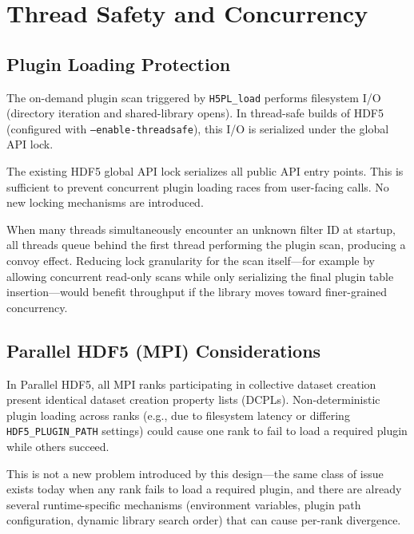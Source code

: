 \documentclass[../RFC-HDFG-2026-001.tex]{subfiles}
\begin{document}
\section{Thread Safety and Concurrency}
\label{sec:thread-safety}

\subsection{Plugin Loading Protection}

The on-demand plugin scan triggered by \texttt{H5PL\_load} performs filesystem
I/O (directory iteration and shared-library opens). In thread-safe builds of
HDF5 (configured with \texttt{--enable-threadsafe}), this I/O is serialized
under the global API lock.

The existing HDF5 global API lock serializes all public API entry points.
This is sufficient to prevent concurrent plugin loading races from user-facing
calls. No new locking mechanisms are introduced.

When many threads simultaneously encounter an unknown filter ID at startup,
all threads queue behind the first thread performing the plugin scan, producing
a convoy effect. Reducing lock granularity for the scan itself---for example
by allowing concurrent read-only scans while only serializing the final plugin
table insertion---would benefit throughput if the library moves toward
finer-grained concurrency.

\subsection{Parallel HDF5 (MPI) Considerations}
\label{sec:parallel}

In Parallel HDF5, all MPI ranks participating in collective dataset creation
present identical dataset creation property lists (DCPLs). Non-deterministic
plugin loading across ranks (e.g., due to filesystem latency or differing
\texttt{HDF5\_PLUGIN\_PATH} settings) could cause one rank to fail to load a
required plugin while others succeed.

This is not a new problem introduced by this design---the same class of
issue exists today when any rank fails to load a required plugin, and there
are already several runtime-specific mechanisms (environment variables,
plugin path configuration, dynamic library search order) that can cause
per-rank divergence.
\end{document}
